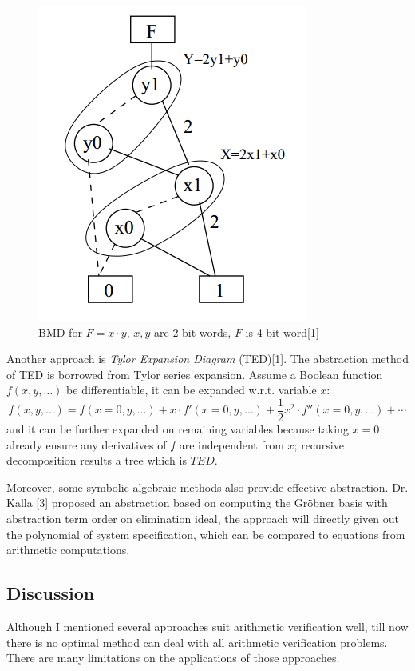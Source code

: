 \documentclass[11pt,twoside, onecolumn]{IEEEtran}
\begin{document}
 \begin{figure}[hbt]
	\begin{center}
	\includegraphics[scale=0.4]{multi.png}
	\end{center}
	\caption{BMD for $F = x \cdot y$, $x,y$ are 2-bit words, $F$ is 4-bit word[1]}
	\label{fig:multi}
\end{figure}

Another approach is \emph{Tylor Expansion Diagram} (TED)[1]. The abstraction method of TED is borrowed
from Tylor series expansion. Assume a Boolean function $f(x,y,\dots)$ be differentiable, it can 
be expanded w.r.t. variable $x$:
$$f(x,y,\dots) = f(x=0,y,\dots) + x\cdot f'(x=0,y,\dots) + \frac{1}{2}x^2\cdot f''(x=0,y,\dots) + \cdots$$
and it can be further expanded on remaining variables because taking $x=0$ already ensure any derivatives of $f$ are 
independent from $x$; recursive decomposition results a tree which is $TED$.

Moreover, some symbolic algebraic methods also provide effective abstraction. Dr. Kalla [3] proposed
an abstraction based on computing the Gr\"obner basis with abstraction term order on 
elimination ideal, the approach will directly given out the polynomial of system specification,
which can be compared to equations from arithmetic computations.

\subsection{Discussion}
Although I mentioned several approaches suit arithmetic verification well, till now there is 
no optimal method can deal with all arithmetic verification problems. There are many limitations
on the applications of those approaches.
\end{document}
